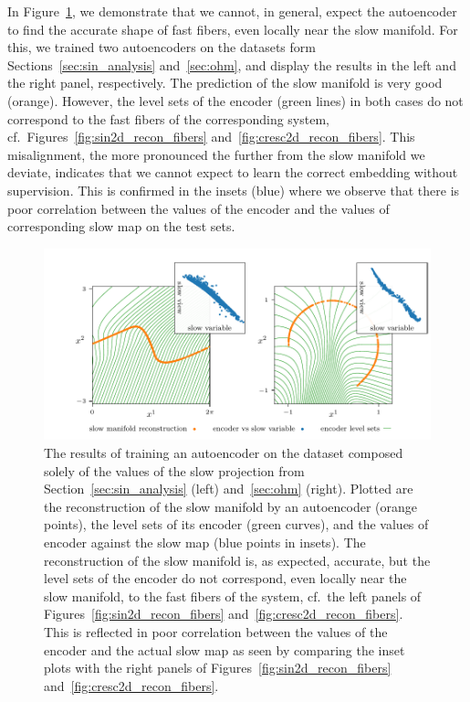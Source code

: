 \documentclass{article}
\begin{document}
In Figure~\ref{fig:sin2d_cresc2d_auto}, we demonstrate that we cannot, in general, expect the autoencoder to find the accurate shape of fast fibers, even locally near the slow manifold. For this, we trained two autoencoders on the datasets form Sections~\ref{sec:sin_analysis} and~\ref{sec:ohm}, and display the results in the left and the right panel, respectively. The prediction of the slow manifold is very good (orange). However, the level sets of the encoder (green lines) in both cases do not correspond to the fast fibers of the corresponding system, cf.~Figures~\ref{fig:sin2d_recon_fibers} and~\ref{fig:cresc2d_recon_fibers}. This misalignment, the more pronounced the further from the slow manifold we deviate, indicates that we cannot expect to learn the correct embedding without supervision. This is confirmed in the insets (blue) where we observe that there is poor correlation between the values of the encoder and the values of corresponding slow map on the test sets.

\begin{figure}
    \centering
    \includegraphics[width=\textwidth]{figs/sin2d_cresc2d_auto.pdf}
    \caption{The results of training an autoencoder on the dataset composed solely of the values of the slow projection from Section~\ref{sec:sin_analysis} (left) and~\ref{sec:ohm} (right). Plotted are the reconstruction of the slow manifold by an autoencoder (orange points), the level sets of its encoder (green curves), and the values of encoder against the slow map (blue points in insets). The reconstruction of the slow manifold is, as expected, accurate, but the level sets of the encoder do not correspond, even locally near the slow manifold, to the fast fibers of the system, cf.~the left panels of Figures~\ref{fig:sin2d_recon_fibers} and~\ref{fig:cresc2d_recon_fibers}. This is reflected in poor correlation between the values of the encoder and the actual slow map as seen by comparing the inset plots with the right panels of Figures~\ref{fig:sin2d_recon_fibers} and~\ref{fig:cresc2d_recon_fibers}.}
    \label{fig:sin2d_cresc2d_auto}
\end{figure}
\end{document}
